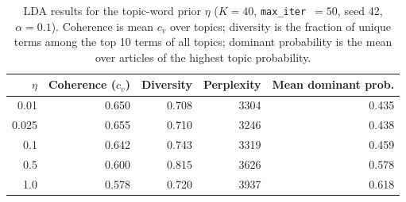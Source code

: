 \begin{table}[ht]
\centering
\caption{LDA results for the topic-word prior $\eta$ ($K=40$, \texttt{max\_iter}~$=50$, seed 42, $\alpha = 0.1$). Coherence is mean $c_v$ over topics; diversity is the fraction of unique terms among the top 10 terms of all topics; dominant probability is the mean over articles of the highest topic probability.}
\label{tab:eta}
\begin{tabular}{rrrrr}
\hline
$\eta$ & Coherence ($c_v$) & Diversity & Perplexity & Mean dominant prob. \\
\hline
0.01  & 0.650 & 0.708 & 3304 & 0.435 \\
0.025 & 0.655 & 0.710 & 3246 & 0.438 \\
0.1   & 0.642 & 0.743 & 3319 & 0.459 \\
0.5   & 0.600 & 0.815 & 3626 & 0.578 \\
1.0   & 0.578 & 0.720 & 3937 & 0.618 \\
\hline
\end{tabular}
\end{table}
